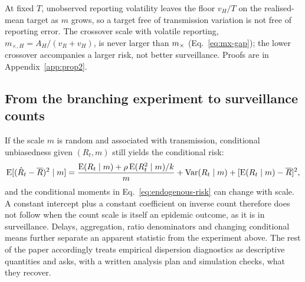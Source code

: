 At fixed $T$, unobserved reporting volatility leaves the floor $v_H/T$ on the realised-mean target as $m$ grows, so a target free of transmission variation is not free of reporting error. The crossover scale with volatile reporting, $m_{\times,H}=A_H/(v_R+v_H)$, is never larger than $m_\times$ (Eq.~\eqref{eq:mx-gap}); the lower crossover accompanies a larger risk, not better surveillance. Proofs are in Appendix~\ref{app:prop2}.

\subsection{From the branching experiment to surveillance counts}
\label{sec:reporting-scope}

If the scale $m$ is random and associated with transmission, conditional unbiasedness given $(R_t,m)$ still yields the conditional risk:
\begin{equation}
 \operatorname{E}[(\hat R_t-\overline{R})^2\mid m]
 =\frac{\operatorname{E}(R_t\mid m)+\rho\operatorname{E}(R_t^2\mid m)/k}{m}
 +\operatorname{Var}(R_t\mid m)+[\operatorname{E}(R_t\mid m)-\overline{R}]^2,
\label{eq:endogenous-risk}
\end{equation}
and the conditional moments in Eq.~\eqref{eq:endogenous-risk} can change with scale. A constant intercept plus a constant coefficient on inverse count therefore does not follow when the count scale is itself an epidemic outcome, as it is in surveillance. Delays, aggregation, ratio denominators and changing conditional means further separate an apparent statistic from the experiment above. The rest of the paper accordingly treats empirical dispersion diagnostics as descriptive quantities and asks, with a written analysis plan and simulation checks, what they recover.
